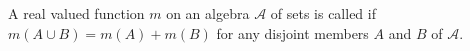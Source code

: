 A real valued function $m$ on an algebra $\mathcal{A}$ of sets is called  if $m(A \cup B) = m(A) + m(B)$ for any disjoint members $A$ and $B$ of $\mathcal{A}$.
